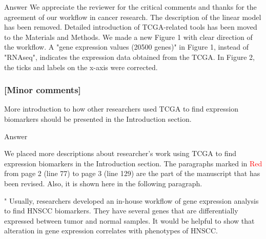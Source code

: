 \documentclass[preprint,12pt]{elsarticle}
\newenvironment{MyIndent}
{\par\leftskip1cm\relax\rightskip1cm\relax}
{\par\leftskip0cm\relax\rightskip0cm\relax}
\newenvironment{MyColorPar}[1]{%
    \leavevmode\color{#1}\ignorespaces%
}{%
}%
\begin{document}
%
\begin{MyColorPar}{blue}
Answer
We appreciate the reviewer for the critical comments and thanks for the agreement of our workflow in cancer research.
The description of the linear model has been removed. 
Detailed introduction of TCGA-related tools has been moved to the Materials and Methods.
We made a new Figure 1 with clear direction of the workflow.
A "gene expression values (20500 genes)" in Figure 1, instead of "RNAseq", indicates the expression data obtained from the TCGA.
In Figure 2, the ticks and labels on the x-axis were corrected.\\[0.5cm]


\begin{MyColorPar}{black} %
\subsubsection*{[Minor comments]}

More introduction to how other researchers used TCGA to find expression biomarkers should be presented in the Introduction section.
\end{MyColorPar}

Answer

We placed more descriptions about researcher's work using TCGA to find expression biomarkers in the Introduction section.
The paragraphs marked in \textcolor{red}{Red} from page 2 (line 77) to page 3 (line 129) are the part of the manuscript that has been revised. Also, it is shown here in the following paragraph.\\[0.3cm]


\begin{MyIndent}
\begin{MyColorPar}{red}

"
Usually, researchers developed an in-house workflow of gene expression analysis to find HNSCC biomarkers.
They have several genes that are differentially expressed between tumor and normal samples.
It would be helpful to show that alteration in gene expression correlates with phenotypes of HNSCC.


\end{MyColorPar}
\end{MyIndent}
\end{MyColorPar}
\end{document}
